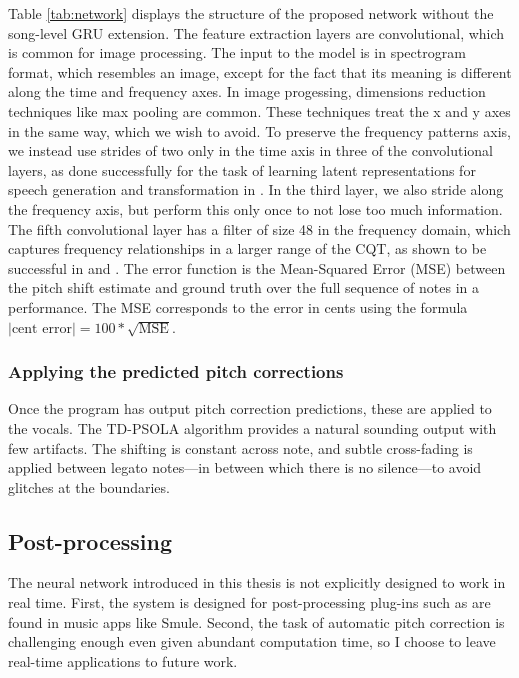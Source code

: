 Table \ref{tab:network} displays the structure of the proposed network without the song-level GRU extension. The feature extraction layers are convolutional, which is common for image processing. The input to the model is in spectrogram format, which resembles an image, except for the fact that its meaning is different along the time and frequency axes. In image progessing, dimensions reduction techniques like max pooling are common. These techniques treat the x and y axes in the same way, which we wish to avoid. To preserve the frequency patterns axis, we instead use strides of two only in the time axis in three of the convolutional layers, as done successfully for the task of learning latent representations for speech generation and transformation in \cite{hsu2017learning}. In the third layer, we also stride along the frequency axis, but perform this only once to not lose too much information. The fifth convolutional layer has a filter of size 48 in the frequency domain, which captures frequency relationships in a larger range of the CQT, as shown to be successful in \cite{bittner2017deep} and \cite{hsu2017learning}. 
The error function is the Mean-Squared Error (MSE) between the pitch shift estimate and ground truth over the full sequence of notes in a performance. The MSE corresponds to the error in cents using the formula $\left|\text{cent error}\right| = 100 * \sqrt{\text{MSE}}$. %

\subsubsection{Applying the predicted pitch corrections}
Once the program has output pitch correction predictions, these are applied to the vocals. The TD-PSOLA algorithm provides a natural sounding output with few artifacts. The shifting is constant across note, and subtle cross-fading is applied between legato notes---in between which there is no silence---to avoid glitches at the boundaries.

\subsection{Post-processing}
The neural network introduced in this thesis is not explicitly designed to work in real time. First, the system is designed for post-processing plug-ins such as are found in music apps like Smule. Second, the task of automatic pitch correction is challenging enough even given abundant computation time, so I choose to leave real-time applications to future work. 

